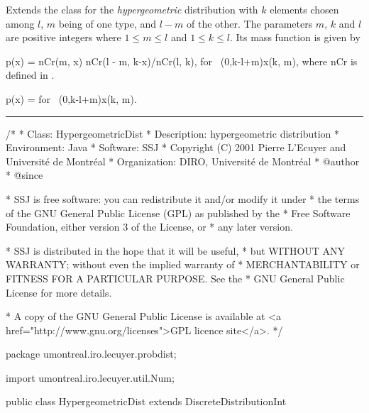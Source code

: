 
Extends the class  for
the {\em hypergeometric\/} distribution \cite[page 101]{rGEN98a} with
$k$ elements chosen among $l$, $m$ being
of one type, and $l-m$ of the other.
The parameters $m$, $k$ and $l$ are positive integers
where $1\le m\le l$ and $1\le k\le l$.
Its mass function is given by
\begin{htmlonly}
\eq
    p(x) =
            \mbox{nCr}(m, x) \mbox{nCr}(l - m, k-x)/\mbox{nCr}(l, k),
 \qquad \mbox{for } \max(0,k-l+m)\le x\le \min(k, m),
\endeq
where nCr is defined in .
\end{htmlonly}
\begin{latexonly}
\eq
    p(x) =
 \qquad \mbox{for } \max(0,k-l+m)\le x\le \min(k, m).  
\endeq
\end{latexonly}


\bigskip\hrule

\begin{code}
\begin{hide}
/*
 * Class:        HypergeometricDist
 * Description:  hypergeometric distribution
 * Environment:  Java
 * Software:     SSJ 
 * Copyright (C) 2001  Pierre L'Ecuyer and Université de Montréal
 * Organization: DIRO, Université de Montréal
 * @author       
 * @since

 * SSJ is free software: you can redistribute it and/or modify it under
 * the terms of the GNU General Public License (GPL) as published by the
 * Free Software Foundation, either version 3 of the License, or
 * any later version.

 * SSJ is distributed in the hope that it will be useful,
 * but WITHOUT ANY WARRANTY; without even the implied warranty of
 * MERCHANTABILITY or FITNESS FOR A PARTICULAR PURPOSE.  See the
 * GNU General Public License for more details.

 * A copy of the GNU General Public License is available at
   <a href="http://www.gnu.org/licenses">GPL licence site</a>.
 */
\end{hide}
package umontreal.iro.lecuyer.probdist;\begin{hide}
import umontreal.iro.lecuyer.util.Num;
\end{hide}

public class HypergeometricDist extends DiscreteDistributionInt\begin{hide} {

   private int m;
   private int l;
   private int k;
   private double p0;
\end{hide}\end{code}\begin{code}\end{code}

